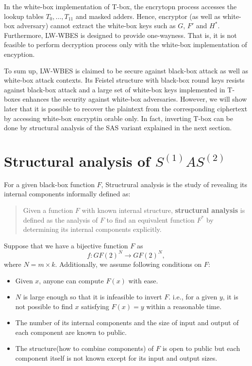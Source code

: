 \documentclass{ieeeaccess}
\begin{document}
In the white-box implementation of T-box,
the encrytopn process accesses the lookup tables
$T_0, \ldots, T_{11}$ and masked adders.
Hence, encryptor (as well as white-box adversary) cannot extract
the white-box keys such as $G$, $F'$ and $H^*$.
Furthermore, LW-WBES is designed to provide one-wayness.
That is, it is not feasible to perform decryption process 
only with the white-box implementation of encyption.

To sum up, LW-WBES is claimed to be secure 
against black-box attack as well as white-box attack contexts.
Its Feistel structure with black-box round keys  resists against
black-box attack and a large set of white-box keys implemented in T-boxes
enhances the security against white-box adversaries.
However, we will show later that it is possible to recover the plaintext from 
the corresponding ciphertext by accessing white-box encryptin orable only.
In fact, inverting T-box can be done by structural analysis of the SAS variant
explained in the next section.

\section{Structural analysis of $S^{(1)}AS^{(2)}$}

For a given black-box function $F$,
Structrural analysis is the study of revealing its internal components
informally defined as:
\begin{quote}
Given a function $F$ with known internal structure,
{\bf structural analysis} is defined as the analysis of $F$
to find an equivalent function $F^*$ by determining its internal components explicitly.
\end{quote}

Suppose that we have a bijective function $F$ as
\[
f:GF(2)^N \to GF(2)^N,
\] 
where $N = m\times k$.
Additionally, we assume following conditions on $F$:
\begin{itemize}
\item Given $x$, anyone can compute $F(x)$ with ease.
\item $N$ is large enough so that it is infeasible to invert $F$.
i.e., for a given $y$, it is not possible to find $x$ satisfying 
$F(x) = y$ within a reasonable time. 
\item The number of its internal components and the size of input and output
of each component are known to public. 
\item The structure(how to combine components) of $F$ is open to public
but each component itself is not known except for its input and output sizes.
\end{itemize}
\end{document}
